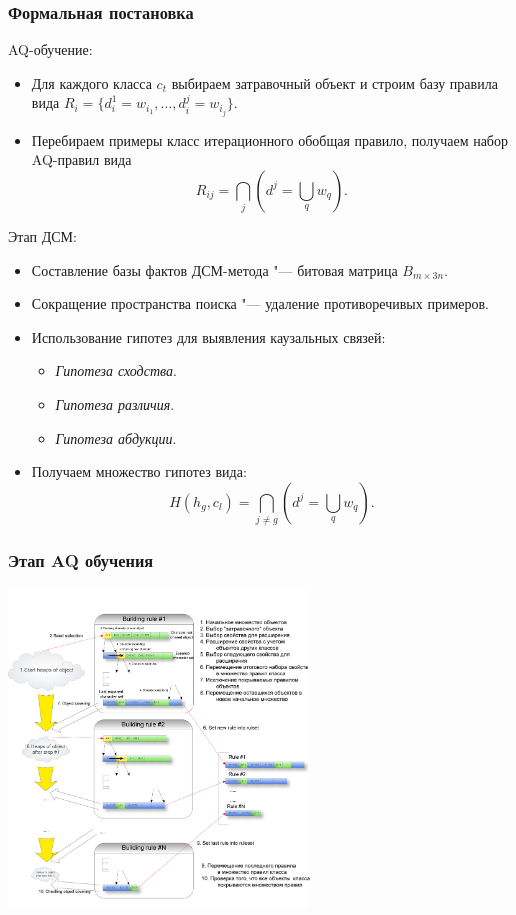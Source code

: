 \documentclass[default]{beamer}
\begin{document}
	\begin{frame}
		\frametitle{Формальная постановка}
		{\scriptsize
		AQ-обучение:
		\begin{itemize}
			\item Для каждого класса $c_t$ выбираем затравочный объект и строим базу правила вида $R_i=\{d_i^1=w_{i_1},\dots, d_i^j=w_{i_j}\}$.
			\item Перебираем примеры класс итерационного обобщая правило, получаем набор AQ-правил вида 
			\[R_{ij}=\bigcap_j\left(d^j=\bigcup_q w_q\right).\]
		\end{itemize}
		\par\bigskip
		Этап ДСМ:
		\begin{itemize}
			\item Составление базы фактов ДСМ-метода "--- битовая матрица $B_{m\times3n}$.
			\item Сокращение пространства поиска "--- удаление противоречивых примеров.
			\item Использование гипотез для выявления каузальных связей:
			\begin{itemize}
				\item \textit{Гипотеза сходства}. 
				\item \textit{Гипотеза различия}. 
				\item \textit{Гипотеза абдукции}. 
			\end{itemize}
			\item Получаем множество гипотез вида:
			\[H(h_g, c_l)=\bigcap_{j\not = g}\left( d^j=\bigcup_q w_q\right).\]
		\end{itemize}
		}
	\end{frame}
	
	\begin{frame}
		\frametitle{Этап AQ обучения}
		
		\centering
		\includegraphics[width=0.6\textwidth]{AQProcess.jpeg}
	\end{frame}
\end{document}
